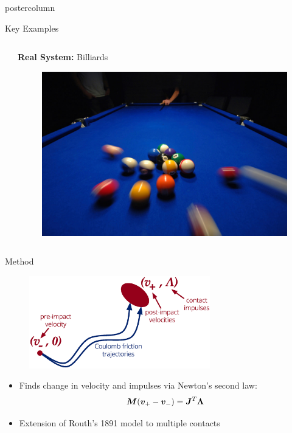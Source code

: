 \documentclass[final,hyperref={pdfpagelabels=false},5pt]{beamer}
\begin{document}
\begin{frame}
\begin{columns}
\begin{column}{.49\textwidth}
\begin{beamercolorbox}[center,wd=\textwidth]{postercolumn}
\begin{minipage}[T]{.95\textwidth}
{\begin{block}{Key Examples}
\begin{center}
\begin{columns}[t]
\begin{column}{.49\textwidth}
				\end{column}
				\begin{column}{.49\textwidth}
				\centering
				\textbf{Real System:} Billiards
				\begin{figure}
				\centering
					\includegraphics[width=.9\textwidth]{BilliardsBreak.jpg}
				\end{figure}

				\end{column}
				\end{columns}
			 \end{center}
			 \vspace{1ex}
            \end{block}
            

            \begin{block}{Method}
            	\begin{figure}
	              	\includegraphics[width=0.7\textwidth]{VelocityConnection}
	              \end{figure}
              \begin{itemize}
              \item Finds change in velocity and impulses via Newton's second law:
	                  $$\Mass (\Velocity_+ - \Velocity_-) = \J^T \Impulse$$
	              \item Extension of Routh's 1891 model to multiple contacts \cite{Routh91}
	              

\end{itemize}
\end{block}}
\end{minipage}
\end{beamercolorbox}
\end{column}
\end{columns}
\end{frame}
\end{document}
